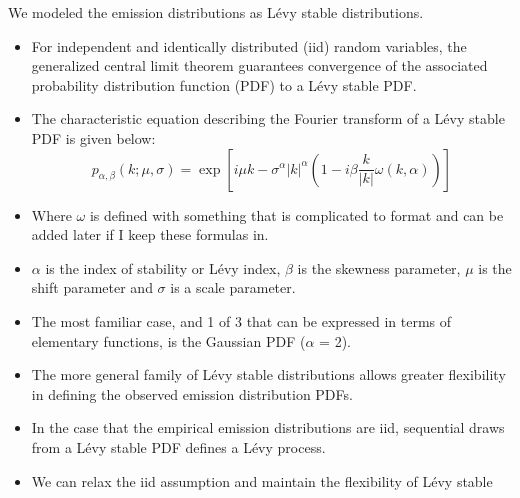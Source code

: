 \documentclass{article}
\begin{document}
  \noindent We modeled the emission distributions as L\'evy stable distributions.  %
  \begin{itemize}
    \item For independent and identically distributed (iid) random variables, the 
    generalized central limit theorem guarantees convergence of the associated 
    probability distribution function (PDF) to a L\'evy stable PDF. \cite{klages_anomalous_2008}
    \item The characteristic equation describing the Fourier transform of a L\'evy 
    stable PDF is given below:
    \begin{equation}
    p_{\alpha, \beta}(k;\mu,\sigma) =\exp\left[i\mu k - \sigma^{\alpha}|k|^{\alpha}\left(1 - i\beta\frac{k}{|k|}\omega(k, \alpha)\right)\right]
    \end{equation}
    \item Where $\omega$ is defined with something that is complicated to format and can be 
    added later if I keep these formulas in. %
    \item $\alpha$ is the index of stability or L\'evy index, $\beta$ is the skewness 
    parameter, $\mu$ is the shift parameter and $\sigma$ is a scale parameter.
    \item The most familiar case, and 1 of 3 that can be expressed in terms of elementary
    functions, is the Gaussian PDF ($\alpha$ = 2).
    \item The more general family of L\'evy stable distributions allows
    greater flexibility in defining the observed emission distribution PDFs.
    \item In the case that the empirical emission distributions are iid, sequential draws
    from a L\'evy stable PDF defines a L\'evy process. 
    \item We can relax the iid assumption and maintain the flexibility of L\'evy stable 

\end{itemize}
\end{document}

